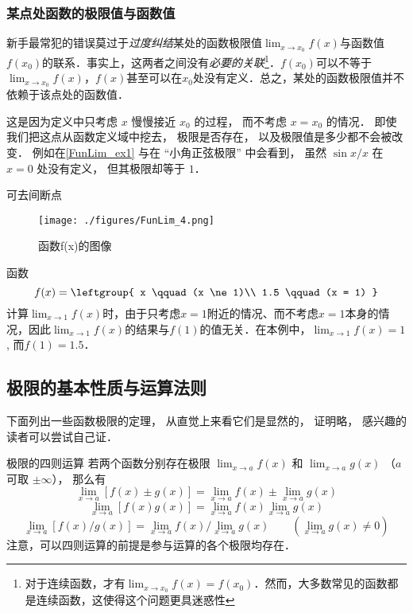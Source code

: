 \subsubsection{某点处函数的极限值与函数值}
新手最常犯的错误莫过于\textsl{过度纠结}某处的函数极限值$\lim_{x\to x_0} f(x)$与函数值$f(x_0)$的联系．事实上，这两者之间没有\textsl{必要的关联}\footnote{对于连续函数，才有$\lim_{x\to x_0} f(x)=f(x_0)$．然而，大多数常见的函数都是连续函数，这使得这个问题更具迷惑性}．$f(x_0)$可以不等于$\lim_{x\to x_0} f(x)$，$f(x)$甚至可以在$x_0$处没有定义．总之，某处的函数极限值并不依赖于该点处的函数值．

这是因为定义中只考虑 $x$ 慢慢接近 $x_0$ 的过程， 而不考虑 $x = x_0$ 的情况． 即使我们把这点从函数定义域中挖去， 极限是否存在， 以及极限值是多少都不会被改变． 例如在\autoref{FunLim_ex1} 与在 “小角正弦极限” 中会看到， 虽然 $\sin x/ x$ 在 $x = 0$ 处没有定义， 但其极限却等于 $1$．

\begin{example}{可去间断点}
\begin{figure}[ht]
\centering
\texttt{[image: ./figures/FunLim\_4.png]}
\caption{函数f(x)的图像} \label{FunLim_fig4}
\end{figure}
函数
\begin{equation}
f(x) = \leftgroup{
x \qquad (x \ne 1)\\
1.5 \qquad (x = 1)
}\end{equation}
计算$\lim_{x\to 1} f(x)$时，由于只考虑$x=1$附近的情况、而不考虑$x=1$本身的情况，因此$\lim_{x\to 1} f(x)$的结果与$f(1)$的值无关．在本例中，$\lim_{x\to 1} f(x)=1$, 而$f(1)=1.5$．
\end{example}

\subsection{极限的基本性质与运算法则}
下面列出一些函数极限的定理， 从直觉上来看它们是显然的， 证明略， 感兴趣的读者可以尝试自己证．
\begin{theorem}{极限的四则运算}
若两个函数分别存在极限 $\lim_{x\to a} f(x)$ 和 $\lim_{x\to a} g(x)$ （$a$ 可取 $\pm \infty$）， 那么有
\begin{equation}
\lim_{x\to a} [f(x) \pm g(x)] = \lim_{x\to a}f(x) \pm  \lim_{x\to a} g(x)
\end{equation}
\begin{equation}
\lim_{x\to a} [f(x) g(x)] = \lim_{x\to a}f(x) \lim_{x\to a} g(x)
\end{equation}
\begin{equation}
\lim_{x\to a} [f(x)/g(x)] = \lim_{x\to a}f(x)/\lim_{x\to a} g(x) \qquad (\lim_{x\to a} g(x) \ne 0)
\end{equation}
注意，可以四则运算的前提是参与运算的各个极限均存在．
\end{theorem}

